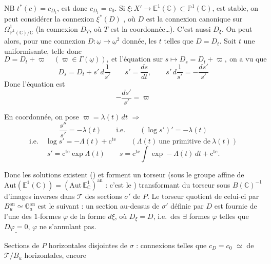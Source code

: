 \documentclass[11pt,a4paper]{article}
\begin{document}
$\underline{\text{NB}}$ \ill{} $t^*(c)=c_{D_t}$, \struck{\ill{}}  est donc $c_{D_t}=c_0$. \struck{\ill{}} Si $\xi:X'\to\mathbb{E}^1(\mathbb{C})\subset\mathbb{P}^1(\mathbb{C})$, est stable, on peut considérer la connexion  $\xi^*(D)$ \struck{\ill{}}, où $D$ est la connexion canonique sur $\Omega^1_{\mathbb{P}^1(\mathbb{C})/\mathbb{C}}$ (la connexion $D_T$, où $T$ est la coordonnée…). C'est aussi $D_\xi$. On peut alors, \struck{\ill{}} pour une connexion \struck{\ill{}} $D:\underline{\omega}\to\underline{\omega}^2$ donnée, \struck{\ill{}}   les $t$ telles que $D=D_t$. \struck{\ill{}} Soit $t$ une uniformisante, telle \ill{} \ill{} donc
\[
D=D_t+\varpi\quad(\varpi\in\Gamma(\underline{\omega})),\ \text{et l'équation sur }s\mapsto D_s=D_t+\varpi,\ \text{on a vu que}
\]
\[
D_s=D_t+s'\,d\frac{1}{s'}\qquad s'=\frac{ds}{dt},\qquad s'\,d\frac{1}{s'}=-\frac{ds'}{s'}
\]
Donc l'équation est
\[
-\frac{ds'}{s'}=\varpi
\]

En coordonnée, on pose $\varpi=\lambda(t)\,dt$ $\Rightarrow$
\[
\frac{s''}{s'}=-\lambda(t)\qquad\text{i.e.}\qquad(\log s')'=-\lambda(t)
\]
\[
\text{i.e.}\quad \log s'=-\Lambda(t)+\mathrm{c}^{\mathrm{te}}\qquad(\Lambda(t)\ \text{une primitive de}\ \lambda(t))
\]
\[
s'=\mathrm{c}^{\mathrm{te}}\exp\Lambda(t)\qquad s=\mathrm{c}^{\mathrm{te}}\int\exp-\Lambda(t)\,dt+\mathrm{c}^{\mathrm{te}}.
\]

Donc les solutions existent () et forment un torseur (sous le groupe affine de $\mathrm{Aut}(\mathbb{E}^1(\mathbb{C}))=(\mathrm{Aut}\,\mathbb{E}^1_{\mathbb{C}})^{\mathrm{an}}$ : c'est le \struck{\ill{}} \uncertain{\ill{}} \ill{}) transformant du torseur \struck{\ill{}} sous $B(\mathbb{C})^{-1}$ \struck{\ill{}} d'images inverses dans $\mathcal{T}$ des sections  $\sigma'$ de $P$. Le torseur quotient de celui-ci par $B_u^{\mathrm{an}}\simeq\mathbb{G}_a^{\mathrm{an}}$ est le suivant : un section au-dessus de $\sigma'$ définie par $D$ est \struck{\ill{}} fournie de l'une des $1$-formes $\varphi$ de la forme $d\xi$, où $D_\xi=D$, i.e.\ des $\exists$ formes $\varphi$ telles que $\underline{D\varphi=0}$, $\varphi$ ne s'annulant pas.

Sections   de $P$ horizontales disjointes de $\sigma$ : connexions  telles que $c_D=c_0$ \struck{\ill{}} $\simeq$  de $\mathcal{T}/B_u$ horizontales,  encore
\end{document}
